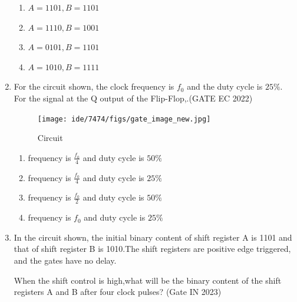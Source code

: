 \begin{enumerate}
\begin{enumerate}
\item $A= 1101,B=1101$
\item $A=1110 ,B=1001$
\item $A=0101 ,B=1101$
\item $A=1010 ,B=1111$
\end{enumerate}
\item For the circuit shown, the clock frequency is $f_0$ and the duty cycle is $25\%$. For the signal at the Q output of the Flip-Flop,\underline{\hspace{20pt}}.\hfill(GATE EC 2022)
		\begin{figure}[h]
			\centering
			\texttt{[image: ide/7474/figs/gate\_image\_new.jpg]}
			\caption{Circuit}
			\label{fig:new_gate}
		\end{figure}
			\begin{enumerate}
			\item frequency is $\frac{{f_0}}{4}$ and duty cycle is $50\%$
			\item frequency is $\frac{{f_0}}{4}$ and duty cycle is $25\%$
			\item frequency is $\frac{{f_0}}{2}$ and duty cycle is $50\%$
			\item frequency is ${f_0}$ and duty cycle is $25\%$
		\end{enumerate}
\item In the circuit shown, the initial binary content of shift register A is 1101 and that of shift register B is 1010.The shift registers are positive edge triggered, and the gates have no delay.

When the shift control is high,what will be the binary content of the shift registers A and B after four clock pulses?
\hfill{(Gate IN 2023)}


\end{enumerate}
